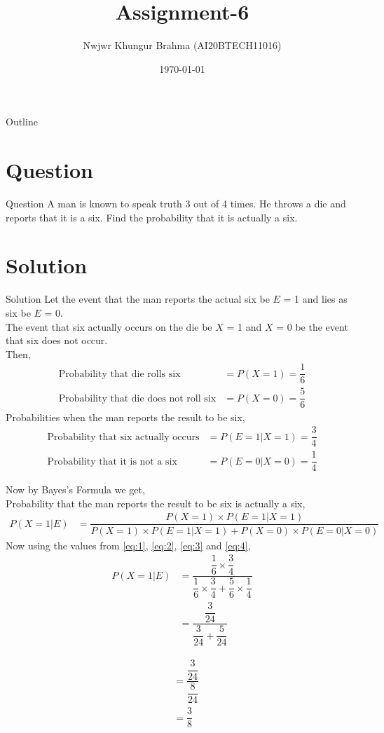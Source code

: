 \documentclass{beamer}
\title{Assignment-6}
\author{Nwjwr Khungur Brahma (AI20BTECH11016)}
\date{\today}
\begin{document}
\begin{frame}
    \titlepage 
\end{frame}


\begin{frame}{Outline}
    \tableofcontents
\end{frame}


\section{Question}
\begin{frame}{Question}
A man is known to speak truth 3 out of 4 times. He throws a die and reports that it is a six. Find the probability that it is actually a six.
\end{frame}

\section{Solution}
\begin{frame}{Solution}
Let the event that the man reports the actual six be $E$ = 1 and lies as six be $E$ = 0.\\The event that six actually occurs on the die be $X$ = 1 and $X$ = 0 be the event that six does not occur.\\
Then,
\begin{align}
\text{Probability that die rolls six}&=P(X=1)=\dfrac{1}{6}\label{eq:1}\\
\text{Probability that die does not roll six}&=P(X=0)=\dfrac{5}{6}\label{eq:2}
\end{align}
Probabilities when the man reports the result to be six,
\begin{align}
\text{Probability that six actually occurs}&=P(E=1|X=1)=\dfrac{3}{4}\label{eq:3}\\
\text{Probability that it is not a six}&=P(E=0|X=0)=\dfrac{1}{4}\label{eq:4}
\end{align}
\end{frame}


\begin{frame}
Now by Bayes's Formula we get,\\
Probability that the man reports the result to be six is actually a six,\\
\begin{align}
P(X=1|E)&=\dfrac{P(X=1)\times P(E=1|X=1)}{P(X=1)\times P(E=1|X=1)+P(X=0)\times P(E=0|X=0)}
\end{align}
Now using the values from \eqref{eq:1}, \eqref{eq:2}, \eqref{eq:3} and \eqref{eq:4},
\begin{align}
P(X=1|E)&=\dfrac{\dfrac{1}{6}\times \dfrac{3}{4}}{\dfrac{1}{6}\times \dfrac{3}{4}+\dfrac{5}{6}\times\dfrac{1}{4}}\\
&=\dfrac{\dfrac{3}{24}}{\dfrac{3}{24}+\dfrac{5}{24}}
\end{align}
\end{frame}


\begin{frame}
\begin{align}
&=\dfrac{\dfrac{3}{24}}{\dfrac{8}{24}}\\
&=\dfrac{3}{8}
\end{align}
\end{frame}
\end{document}
